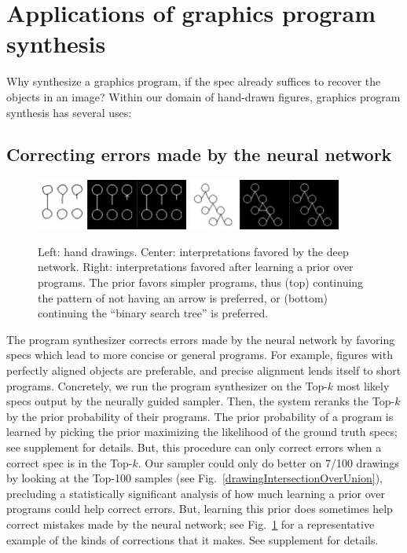 \documentclass{article}
\theoremstyle{definition}
\begin{document}
\section{Applications of graphics program synthesis}\label{applicationsSection}
Why synthesize a graphics program,
if the spec already suffices to recover the objects in an image?
Within our domain of hand-drawn figures, graphics program synthesis has several uses:

\pagebreak\subsection{Correcting errors made by the neural network}\label{synthesizerHelpsParsing}
\begin{figure}\vspace{-0.5cm}
  \includegraphics[width = 5cm]{figures/programSuccess7.png}
  \includegraphics[width = 5cm]{figures/programSuccess16.png}
  \caption{Left: hand drawings. Center: interpretations favored by the deep network. Right: interpretations favored after learning a prior over programs. The prior favors  simpler programs, thus (top) continuing the pattern of not having an arrow is preferred, or (bottom) continuing the ``binary search tree'' is preferred.}\label{exampleOfProgramCorrectingMistake}
\vspace{-0.75cm}  \end{figure}
The program synthesizer corrects errors made by the neural network by favoring specs which lead to more
concise or general programs.  For example, figures with perfectly aligned objects are preferable, %
and precise alignment lends itself to short
programs.
Concretely,
we run the program synthesizer on the
Top-$k$  most likely specs output by the neurally guided sampler.
Then, the system
reranks the Top-$k$  by  the prior probability of their programs.
The prior probability of a program is learned by picking the prior maximizing
the likelihood of the ground truth specs;
see supplement for details.
But, this procedure can only correct errors when
a correct spec is in the Top-$k$.
Our sampler could only do better on
7/100 drawings by looking at the Top-100 samples
(see Fig.~\ref{drawingIntersectionOverUnion}),
precluding a statistically significant analysis of how much
learning a prior over programs could help correct errors.
But,
learning this prior does sometimes 
help correct mistakes made by the neural network; %
see
Fig.~\ref{exampleOfProgramCorrectingMistake} for a representative
example of the kinds of corrections that it makes.
See supplement for details.
\end{document}
